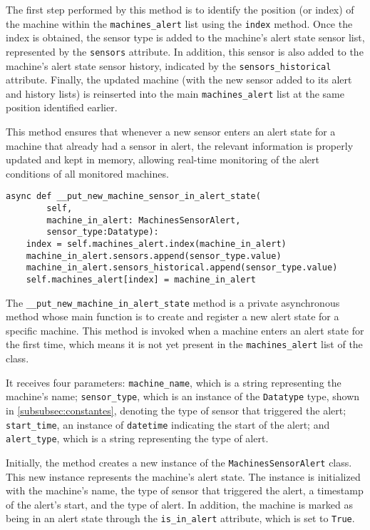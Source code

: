 The first step performed by this method is to identify the position (or index) of the machine within the \texttt{machines\_alert} list using the \texttt{index} method. Once the index is obtained, the sensor type is added to the machine's alert state sensor list, represented by the \texttt{sensors} attribute. In addition, this sensor is also added to the machine's alert state sensor history, indicated by the \texttt{sensors\_historical} attribute. Finally, the updated machine (with the new sensor added to its alert and history lists) is reinserted into the main \texttt{machines\_alert} list at the same position identified earlier.

This method ensures that whenever a new sensor enters an alert state for a machine that already had a sensor in alert, the relevant information is properly updated and kept in memory, allowing real-time monitoring of the alert conditions of all monitored machines.

\begin{verbatim}
async def __put_new_machine_sensor_in_alert_state(
        self,
        machine_in_alert: MachinesSensorAlert,
        sensor_type:Datatype):
    index = self.machines_alert.index(machine_in_alert)
    machine_in_alert.sensors.append(sensor_type.value)
    machine_in_alert.sensors_historical.append(sensor_type.value)
    self.machines_alert[index] = machine_in_alert
\end{verbatim}

The \texttt{\_\_put\_new\_machine\_in\_alert\_state} method is a private asynchronous method whose main function is to create and register a new alert state for a specific machine. This method is invoked when a machine enters an alert state for the first time, which means it is not yet present in the \texttt{machines\_alert} list of the class.

It receives four parameters: \texttt{machine\_name}, which is a string representing the machine's name; \texttt{sensor\_type}, which is an instance of the \texttt{Datatype} type, shown in \ref{subsubsec:constantes}, denoting the type of sensor that triggered the alert; \texttt{start\_time}, an instance of \texttt{datetime} indicating the start of the alert; and \texttt{alert\_type}, which is a string representing the type of alert.

Initially, the method creates a new instance of the \texttt{MachinesSensorAlert} class. This new instance represents the machine's alert state. The instance is initialized with the machine's name, the type of sensor that triggered the alert, a timestamp of the alert's start, and the type of alert. In addition, the machine is marked as being in an alert state through the \texttt{is\_in\_alert} attribute, which is set to \texttt{True}.

